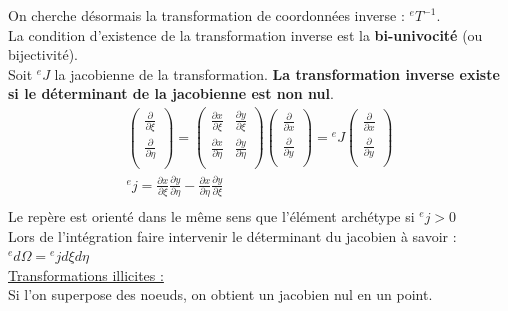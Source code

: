 \documentclass[../main.tex]{subfiles}
\begin{document}
On cherche désormais la transformation de coordonnées inverse : ${}^eT^{-1}$.\\
La condition d'existence de la transformation inverse est la \textbf{bi-univocité} (ou bijectivité).\\
Soit ${}^e J$ la jacobienne de la transformation. \textbf{La transformation inverse existe si le déterminant de la jacobienne est non nul}.\\
\begin{equation}
    \begin{gathered}
        \begin{pmatrix}
            \frac{\partial}{\partial \xi} \\ \frac{\partial}{\partial \eta}\\
        \end{pmatrix} = \begin{pmatrix}
            \frac{\partial x}{\partial \xi} & \frac{\partial y}{\partial \xi}\\
            \frac{\partial x}{\partial \eta} & \frac{\partial y}{\partial \eta}\\
        \end{pmatrix} \begin{pmatrix}
            \frac{\partial}{\partial x}\\ \frac{\partial}{\partial y} \\
        \end{pmatrix} = {}^e J \begin{pmatrix}
            \frac{\partial}{\partial x} \\ \frac{\partial}{\partial y}\\
        \end{pmatrix}\\
        {}^e j = \frac{\partial x}{\partial \xi}\frac{\partial y}{\partial \eta} - \frac{\partial x}{\partial \eta}\frac{\partial y }{\partial \xi}\\
    \end{gathered}
\end{equation}
\warning Le repère est orienté dans le même sens que l'élément archétype si ${}^e j>0$\\

\warning Lors de l'intégration faire intervenir le déterminant du jacobien à savoir : ${}^ed\Omega = {}^ej d\xi d\eta$\\

\quad \underline{Transformations illicites :}\\
Si l'on superpose des noeuds, on obtient un jacobien nul en un point. \\
\end{document}
